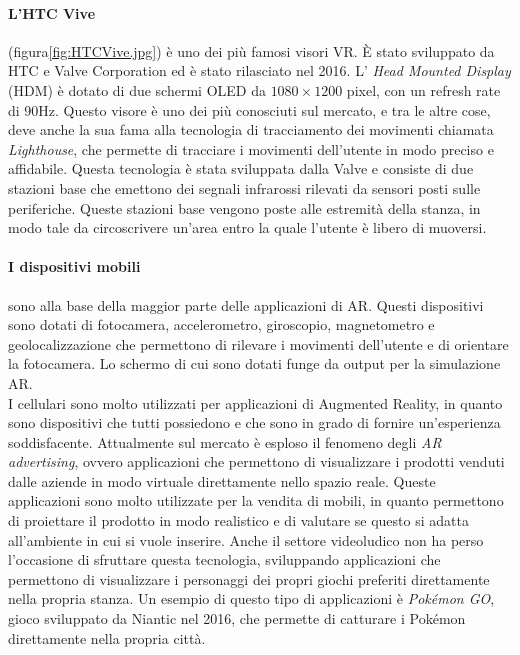         \paragraph{L'HTC Vive} (figura\ref{fig:HTCVive.jpg}) è uno dei più famosi visori VR. È stato sviluppato da HTC e Valve Corporation ed è stato
            rilasciato nel 2016. L' \textit{Head Mounted Display} (HDM) è dotato di due schermi OLED da $1080\times1200$ pixel, 
            con un refresh rate di 90Hz\cite{Vive}. Questo visore è uno dei più conosciuti sul mercato, 
            e tra le altre cose, deve anche la sua fama alla tecnologia di tracciamento dei movimenti chiamata \textit{Lighthouse}, che permette di tracciare
            i movimenti dell'utente in modo preciso e affidabile. Questa tecnologia è stata sviluppata dalla Valve
            e consiste di due stazioni base che emettono dei segnali infrarossi rilevati da sensori posti 
            sulle periferiche. Queste stazioni base vengono poste alle estremità della stanza, in modo tale da circoscrivere
            un'area entro la quale l'utente è libero di muoversi.

        \paragraph{I dispositivi mobili} sono alla base della maggior parte delle applicazioni di AR. Questi dispositivi
            sono dotati di fotocamera, accelerometro, giroscopio, magnetometro e geolocalizzazione che permettono di rilevare i movimenti
            dell'utente e di orientare la fotocamera. Lo schermo di cui sono dotati funge da output per la simulazione AR.\\
            I cellulari sono molto utilizzati per applicazioni di Augmented Reality, in quanto
            sono dispositivi che tutti possiedono e che sono in grado di fornire un'esperienza soddisfacente.
            Attualmente sul mercato è esploso il fenomeno degli \textit{AR advertising}, ovvero applicazioni che permettono
            di visualizzare i prodotti venduti dalle aziende in modo virtuale direttamente nello spazio reale. Queste applicazioni
            sono molto utilizzate per la vendita di mobili, in quanto permettono di proiettare il prodotto in modo realistico
            e di valutare se questo si adatta all'ambiente in cui si vuole inserire. Anche il settore videoludico non ha 
            perso l'occasione di sfruttare questa tecnologia, sviluppando applicazioni che permettono di
            visualizzare i personaggi dei propri giochi preferiti direttamente nella propria stanza. Un esempio di questo
            tipo di applicazioni è \textit{Pokémon GO}, gioco sviluppato da Niantic nel 2016, che permette di catturare i
            Pokémon direttamente nella propria città.
            
